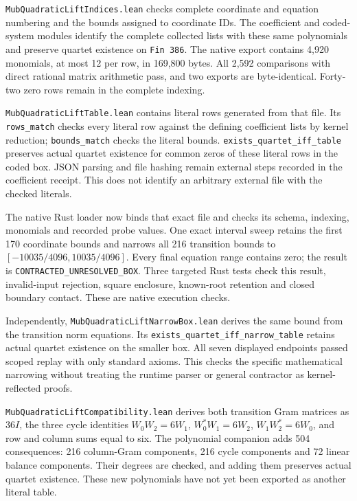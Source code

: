 \documentclass[
]{article}
\begin{document}
\nolinkurl{MubQuadraticLiftIndices.lean} checks complete coordinate and
equation numbering and the bounds assigned to coordinate IDs. The
coefficient and coded-system modules identify the complete collected
lists with these same polynomials and preserve quartet existence on
\nolinkurl{Fin 386}. The native export contains 4,920 monomials, at most
12 per row, in 169,800 bytes. All 2,592 comparisons with direct rational
matrix arithmetic pass, and two exports are byte-identical. Forty-two
zero rows remain in the complete indexing.

\nolinkurl{MubQuadraticLiftTable.lean} contains literal rows generated
from that file. Its \nolinkurl{rows_match} checks every literal row
against the defining coefficient lists by kernel reduction;
\nolinkurl{bounds_match} checks the literal bounds.
\nolinkurl{exists_quartet_iff_table} preserves actual quartet existence
for common zeros of these literal rows in the coded box. JSON parsing
and file hashing remain external steps recorded in the coefficient
receipt. This does not identify an arbitrary external file with the
checked literals.

The native Rust loader now binds that exact file and checks its schema,
indexing, monomials and recorded probe values. One exact interval sweep
retains the first 170 coordinate bounds and narrows all 216 transition
bounds to \([-10035/4096,10035/4096]\). Every final equation range
contains zero; the result is \nolinkurl{CONTRACTED_UNRESOLVED_BOX}.
Three targeted Rust tests check this result, invalid-input rejection,
square enclosure, known-root retention and closed boundary contact.
These are native execution checks.

Independently, \nolinkurl{MubQuadraticLiftNarrowBox.lean} derives the
same bound from the transition norm equations. Its
\nolinkurl{exists_quartet_iff_narrow_table} retains actual quartet
existence on the smaller box. All seven displayed endpoints passed
scoped replay with only standard axioms. This checks the specific
mathematical narrowing without treating the runtime parser or general
contractor as kernel-reflected proofs.

\nolinkurl{MubQuadraticLiftCompatibility.lean} derives both transition
Gram matrices as \(36I\), the three cycle identities \(W_0W_2=6W_1\),
\(W_0^*W_1=6W_2\), \(W_1W_2^*=6W_0\), and row and column sums equal to
six. The polynomial companion adds 504 consequences: 216 column-Gram
components, 216 cycle components and 72 linear balance components. Their
degrees are checked, and adding them preserves actual quartet existence.
These new polynomials have not yet been exported as another literal
table.
\end{document}
